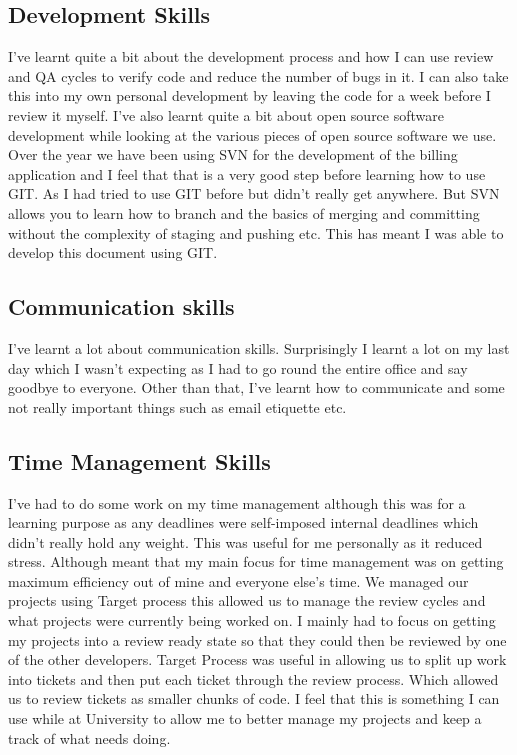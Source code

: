 {	\subsection{Development Skills}{
		I've learnt quite a bit about the development process and how I can use review and QA cycles to verify code and reduce the number of bugs in it. I can also take this into my own personal development by leaving the code for a week before I review it myself. I've also learnt quite a bit about open source software development while looking at the various pieces of open source software we use. Over the year we have been using SVN for the development of the billing application and I feel that that is a very good step before learning how to use GIT. As I had tried to use GIT before but didn't really get anywhere. But SVN allows you to learn how to branch and the basics of merging and committing without the complexity of staging and pushing etc. This has meant I was able to develop this document using GIT.
	}
	\subsection{Communication skills}{I've learnt a lot about communication skills. Surprisingly I learnt a lot on my last day which I wasn't expecting as I had to go round the entire office and say goodbye to everyone. Other than that, I've learnt how to communicate and some not really important things such as email etiquette etc.}
	\subsection{Time Management Skills}{I've had to do some work on my time management although this was for a learning purpose as any deadlines were self-imposed internal deadlines which didn't really hold any weight. This was useful for me personally as it reduced stress. Although meant that my main focus for time management was on getting maximum efficiency out of mine and everyone else's time. We managed our projects using Target process\cite{targetProcess2017} this allowed us to manage the review cycles and what projects were currently being worked on. I mainly had to focus on getting my projects into a review ready state so that they could then be reviewed by one of the other developers. Target Process\cite{targetProcess2017} was useful in allowing us to split up work into tickets and then put each ticket through the review process. Which allowed us to review tickets as smaller chunks of code. I feel that this is something I can use while at University to allow me to better manage my projects and keep a track of what needs doing.
}}
